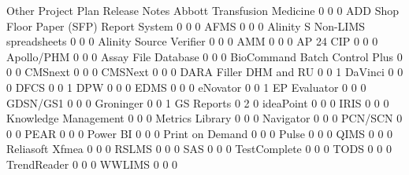 \documentclass{article}
\begin{document}
\begin{Schunk}
\begin{Soutput}
                                           Other Project Plan Release Notes
  Abbott Transfusion Medicine                  0            0             0
  ADD Shop Floor Paper (SFP) Report System     0            0             0
  AFMS                                         0            0             0
  Alinity S Non-LIMS spreadsheets              0            0             0
  Alinity Source Verifier                      0            0             0
  AMM                                          0            0             0
  AP 24 CIP                                    0            0             0
  Apollo/PHM                                   0            0             0
  Assay File Database                          0            0             0
  BioCommand Batch Control Plus                0            0             0
  CMSnext                                      0            0             0
  CMSNext                                      0            0             0
  DARA Filler DHM and RU                       0            0             1
  DaVinci                                      0            0             0
  DFCS                                         0            0             1
  DPW                                          0            0             0
  EDMS                                         0            0             0
  eNovator                                     0            0             1
  EP Evaluator                                 0            0             0
  GDSN/GS1                                     0            0             0
  Groninger                                    0            0             1
  GS Reports                                   0            2             0
  ideaPoint                                    0            0             0
  IRIS                                         0            0             0
  Knowledge Management                         0            0             0
  Metrics Library                              0            0             0
  Navigator                                    0            0             0
  PCN/SCN                                      0            0             0
  PEAR                                         0            0             0
  Power BI                                     0            0             0
  Print on Demand                              0            0             0
  Pulse                                        0            0             0
  QIMS                                         0            0             0
  Reliasoft Xfmea                              0            0             0
  RSLMS                                        0            0             0
  SAS                                          0            0             0
  TestComplete                                 0            0             0
  TODS                                         0            0             0
  TrendReader                                  0            0             0
  WWLIMS                                       0            0             0
                                          

\end{Soutput}
\end{Schunk}
\end{document}
